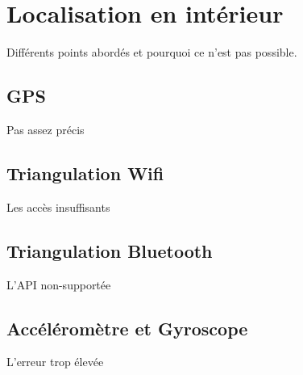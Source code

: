 \section{Localisation en intérieur}
Différents points abordés et pourquoi ce n'est pas possible.
\subsection{GPS}
Pas assez précis

\subsection{Triangulation Wifi}
Les accès insuffisants
\subsection{Triangulation Bluetooth}
L'API non-supportée
\subsection{Accéléromètre et Gyroscope}
L'erreur trop élevée